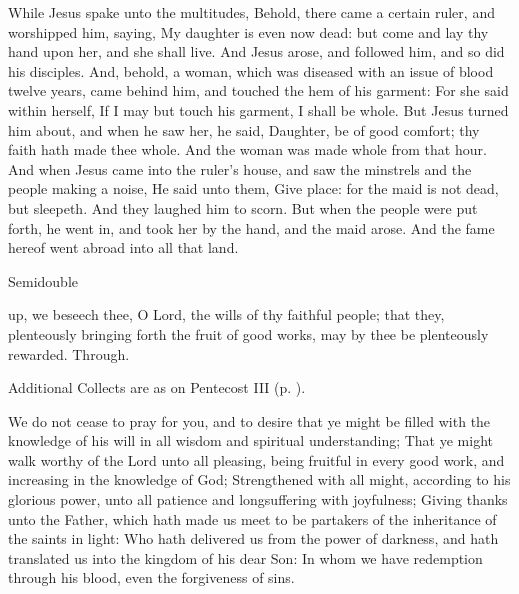  While Jesus spake unto the multitudes, Behold, there came a certain ruler, and worshipped him, saying, My daughter is even now dead: but come and lay thy hand upon her, and she shall live. And Jesus arose, and followed him, and so did his disciples. And, behold, a woman, which was diseased with an issue of blood twelve years, came behind him, and touched the hem of his garment: For she said within herself, If I may but touch his garment, I shall be whole. But Jesus turned him about, and when he saw her, he said, Daughter, be of good comfort; thy faith hath made thee whole. And the woman was made whole from that hour. And when Jesus came into the ruler's house, and saw the minstrels and the people making a noise, He said unto them, Give place: for the maid is not dead, but sleepeth. And they laughed him to scorn. But when the people were put forth, he went in, and took her by the hand, and the maid arose. And the fame hereof went abroad into all that land.

\begin{inhead}
{Semidouble}
\end{inhead}

\collect
{} up, we beseech thee, O Lord, the wills of thy faithful people; that they, plenteously bringing forth the fruit of good works, may by thee be plenteously rewarded. Through.
\begin{rubric}
    Additional Collects are as on Pentecost III (p. \pageref{PentecostIII}).
\end{rubric}

 We do not cease to pray for you, and to desire that ye might be filled with the knowledge of his will in all wisdom and spiritual understanding; That ye might walk worthy of the Lord unto all pleasing, being fruitful in every good work, and increasing in the knowledge of God; Strengthened with all might, according to his glorious power, unto all patience and longsuffering with joyfulness; Giving thanks unto the Father, which hath made us meet to be partakers of the inheritance of the saints in light: Who hath delivered us from the power of darkness, and hath translated us into the kingdom of his dear Son: In whom we have redemption through his blood, even the forgiveness of sins.

